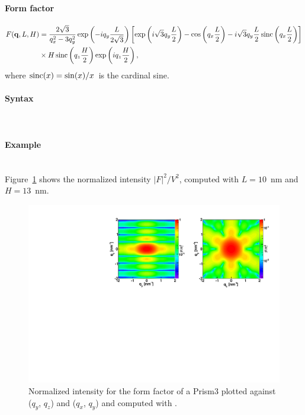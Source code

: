\paragraph{Form factor}
\begin{align*}
F(\mathbf{q},L, H) &= \frac{2 \sqrt{3}}{q_x^2-3q_y^2}  \exp\left(-i q_y\frac{L}{2\sqrt{3}}\right)\left[\exp\left(i \sqrt{3} q_y \frac{L}{2} \right)-\cos\left(q_x \frac{L}{2}\right)-i \sqrt{3} q_y \frac{L}{2} \operatorname{sinc}\left(q_x \frac{L}{2}\right) \right] \\
  &
\times  H \operatorname{sinc}\left(q_z \frac{H}{2} \right) \exp\left(i q_z \frac{H}{2}\right),
\end{align*}
where $\operatorname{sinc}(x)=\sin(x)/x$ is the cardinal sine.

\paragraph{Syntax}\strut\\

\paragraph{Example}\strut\\
Figure~\ref{fig:FFprism3Ex} shows the normalized intensity
$|F|^2/V^2$, computed with $L=10$~nm and \mbox{$H=13$~nm.}
\begin{figure}[ht]
\begin{center}
\includegraphics[angle=-90,width=\textwidth]{fig/ff/figffprism3.pdf}
\end{center}
\caption{Normalized intensity for the form factor of a Prism3
 plotted against ($q_y$, $q_z$) and  ($q_x$, $q_y$) and
  computed with .}
\label{fig:FFprism3Ex}
\end{figure}

